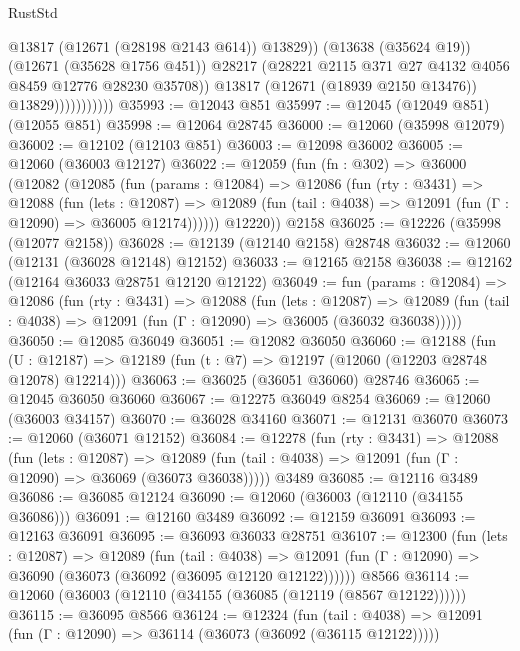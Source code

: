 \begin{lexlean}{RustStd}
\begin{coremodule}
                                @13817
                                (@12671 (@28198 @2143 @614))
                                @13829))
                            (@13638 (@35624 @19))
                            (@12671 (@35628 @1756 @451))
                            @28217
                            (@28221 @2115 @371 @27 @4132 @4056 @8459 @12776 @28230 @35708))
                          @13817
                          (@12671 (@18939 @2150 @13476))
                          @13829)))))))))))
@35993 := @12043 @851
@35997 := @12045 (@12049 @851) (@12055 @851)
@35998 := @12064 @28745
@36000 := @12060 (@35998 @12079)
@36002 := @12102 (@12103 @851)
@36003 := @12098 @36002
@36005 := @12060 (@36003 @12127)
@36022 := @12059
    (fun (fn : @302) =>
    @36000
      (@12082
        (@12085
          (fun (params : @12084) =>
          @12086
            (fun (rty : @3431) =>
            @12088
              (fun (lets : @12087) =>
              @12089 (fun (tail : @4038) => @12091 (fun (Γ : @12090) => @36005 @12174))))))
        @12220))
    @2158
@36025 := @12226 (@35998 (@12077 @2158))
@36028 := @12139 (@12140 @2158) @28748
@36032 := @12060 (@12131 (@36028 @12148) @12152)
@36033 := @12165 @2158
@36038 := @12162 (@12164 @36033 @28751 @12120 @12122)
@36049 := fun (params : @12084) =>
  @12086
    (fun (rty : @3431) =>
    @12088
      (fun (lets : @12087) =>
      @12089 (fun (tail : @4038) => @12091 (fun (Γ : @12090) => @36005 (@36032 @36038)))))
@36050 := @12085 @36049
@36051 := @12082 @36050
@36060 := @12188
    (fun (U : @12187) => @12189 (fun (t : @7) => @12197 (@12060 (@12203 @28748 @12078) @12214)))
@36063 := @36025 (@36051 @36060) @28746
@36065 := @12045 @36050 @36060
@36067 := @12275 @36049 @8254
@36069 := @12060 (@36003 @34157)
@36070 := @36028 @34160
@36071 := @12131 @36070
@36073 := @12060 (@36071 @12152)
@36084 := @12278
    (fun (rty : @3431) =>
    @12088
      (fun (lets : @12087) =>
      @12089 (fun (tail : @4038) => @12091 (fun (Γ : @12090) => @36069 (@36073 @36038)))))
    @3489
@36085 := @12116 @3489
@36086 := @36085 @12124
@36090 := @12060 (@36003 (@12110 (@34155 @36086)))
@36091 := @12160 @3489
@36092 := @12159 @36091
@36093 := @12163 @36091
@36095 := @36093 @36033 @28751
@36107 := @12300
    (fun (lets : @12087) =>
    @12089
      (fun (tail : @4038) =>
      @12091 (fun (Γ : @12090) => @36090 (@36073 (@36092 (@36095 @12120 @12122))))))
    @8566
@36114 := @12060 (@36003 (@12110 (@34155 (@36085 (@12119 (@8567 @12122))))))
@36115 := @36095 @8566
@36124 := @12324
    (fun (tail : @4038) => @12091 (fun (Γ : @12090) => @36114 (@36073 (@36092 (@36115 @12122)))))

\end{coremodule}
\end{lexlean}
